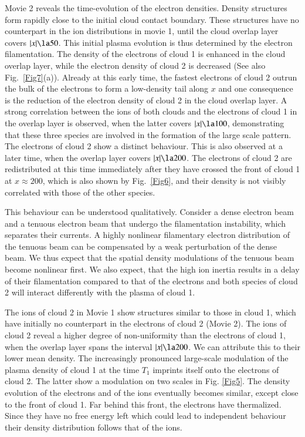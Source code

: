 \documentclass[structabstract]{aa}
\begin{document}
Movie 2 reveals the time-evolution of the electron densities. Density 
structures form rapidly close to the initial 
cloud contact boundary. These structures have no counterpart in the ion 
distributions in movie 1, until the cloud overlap layer covers $|x| \la 50$. 
This initial plasma evolution is thus determined by the electron 
filamentation. The density of the electrons of cloud 1 is enhanced in 
the cloud overlap layer, while the electron density of cloud 2 is decreased
(See also Fig.~\ref{Fig7}(a)). Already at this early time, the fastest 
electrons of cloud 2 outrun the bulk of the electrons to form a low-density 
tail along $x$ and one consequence is the reduction of the electron density 
of cloud 2 in the cloud overlap layer. A strong correlation between the ions 
of both clouds and the electrons of cloud 1 in the overlap layer is observed, 
when the latter covers $|x| \la 100$, demonstrating that these three species 
are involved in the formation of the large scale pattern. The electrons of 
cloud 2 show a distinct behaviour. This is also observed at a later time, 
when the overlap layer covers $|x| \la 200$. The electrons of cloud 2 are 
redistributed at this time immediately after they have crossed the front 
of cloud 1 at $x\approx 200$, which is also shown by Fig.~\ref{Fig6}, and 
their density is not visibly correlated with those of the other species. 

This behaviour can be understood qualitatively. Consider a dense electron 
beam and a tenuous electron beam that undergo the filamentation instability, 
which separates their currents. A highly nonlinear filamentary electron 
distribution of the tenuous beam can be compensated by a weak perturbation 
of the dense beam. We thus expect that the spatial density modulations of 
the tenuous beam become nonlinear first. We also expect, that the high ion 
inertia results in a delay of their filamentation compared to that of the 
electrons and both species of cloud 2 will interact differently with the 
plasma of cloud 1. 

The ions of cloud 2 in Movie 1 show structures similar to those in cloud 1, 
which have initially no counterpart in the electrons of cloud 2 (Movie 2). 
The ions of cloud 2 reveal a higher degree of non-uniformity than the 
electrons of cloud 1, when the overlap layer spans the interval $|x| \la 
200$. We can attribute this to their lower mean density. The increasingly 
pronounced large-scale modulation of the plasma density of cloud 1 at the 
time $T_1$ imprints itself onto the electrons of cloud 2. The latter show 
a modulation on two scales in Fig. \ref{Fig5}. The density evolution of the 
electrons and of the ions eventually becomes similar, except close to the 
front of cloud 1. Far behind this front, the electrons have thermalized. 
Since they have no free energy left which could lead to independent behaviour 
their density distribution follows that of the ions.
\end{document}
